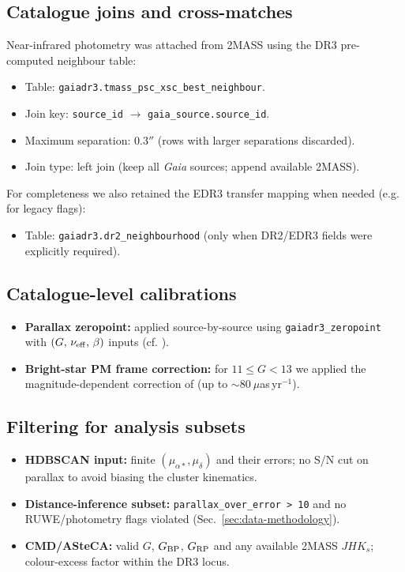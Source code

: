\documentclass[../main.tex]{subfiles}
\begin{document}
\subsection{Catalogue joins and cross-matches}
\label{app:data:xmatch}
Near-infrared photometry was attached from 2MASS using the DR3 pre-computed neighbour table:
\begin{itemize}
  \item Table: \verb|gaiadr3.tmass_psc_xsc_best_neighbour|.
  \item Join key: \verb|source_id| $\rightarrow$ \verb|gaia_source.source_id|.
  \item Maximum separation: $0.3''$ (rows with larger separations discarded).
  \item Join type: left join (keep all \textit{Gaia} sources; append available 2MASS).
\end{itemize}

For completeness we also retained the EDR3 transfer mapping when needed (e.g. for legacy flags):
\begin{itemize}
  \item Table: \verb|gaiadr3.dr2_neighbourhood| (only when DR2/EDR3 fields were explicitly required).
\end{itemize}

\subsection{Catalogue-level calibrations}
\label{app:data:cals}
\begin{itemize}
  \item \textbf{Parallax zeropoint:} applied source-by-source using \texttt{gaiadr3\_zeropoint} with $(G,\,\nu_{\rm eff},\,\beta)$ inputs (cf. \citealt{2021A&A...649A...2L}).
  \item \textbf{Bright-star PM frame correction:} for $11\le G < 13$ we applied the magnitude-dependent correction of \cite{2021A&A...649A.124C} (up to $\sim 80~\mu$as\,yr$^{-1}$).
\end{itemize}

\subsection{Filtering for analysis subsets}
\label{app:data:subsets}
\begin{itemize}
  \item \textbf{HDBSCAN input:} finite $(\mu_{\alpha*},\mu_\delta)$ and their errors; no S/N cut on parallax to avoid biasing the cluster kinematics.
  \item \textbf{Distance-inference subset:} \verb|parallax_over_error > 10| and no RUWE/photometry flags violated (Sec.~\ref{sec:data-methodology}).
  \item \textbf{CMD/ASteCA:} valid $G$, $G_{\rm BP}$, $G_{\rm RP}$ and any available 2MASS $JHK_s$; colour-excess factor within the DR3 locus.
\end{itemize}
\end{document}
